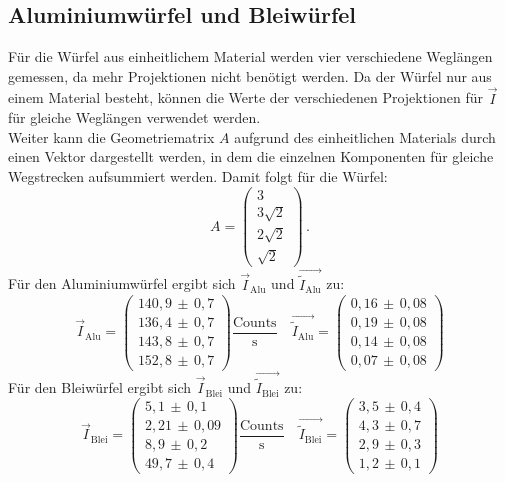 \subsection{Aluminiumwürfel und Bleiwürfel}
Für die Würfel aus einheitlichem Material werden vier verschiedene Weglängen gemessen, da mehr Projektionen nicht benötigt werden. Da der Würfel nur aus einem Material besteht, können die Werte der verschiedenen Projektionen für $\vec{I}$ für gleiche Weglängen verwendet werden. \\
Weiter kann die Geometriematrix $A$ aufgrund des einheitlichen Materials durch einen Vektor dargestellt werden, in dem die einzelnen Komponenten für gleiche Wegstrecken aufsummiert werden.
Damit folgt für die Würfel:
\begin{equation}
  A=
  \begin{pmatrix}
    3 \\
    3\sqrt{2} \\
    2\sqrt{2} \\
    \sqrt{2}
  \end{pmatrix} \, .
\end{equation}
\FloatBarrier
\noindent Für den Aluminiumwürfel ergibt sich $\vec{I}_\mathrm{Alu}$ und $\vec{\tilde{I}_\mathrm{Alu}}$ zu:
\begin{equation}
	\vec{I}_\mathrm{Alu}=
	\begin{pmatrix}
		140,9\,\pm\,0,7 \\
		136,4\,\pm\,0,7 \\
		143,8\,\pm\,0,7 \\
    152,8\,\pm\,0,7
	\end{pmatrix}
	\frac{\mathrm{Counts}}{\si{\second}}\quad
	\vec{\tilde{I}_\mathrm{Alu}}=
	\begin{pmatrix}
		0,16\,\pm\,0,08 \\
		0,19\,\pm\,0,08 \\
		0,14\,\pm\,0,08 \\
    0,07\,\pm\,0,08
	\end{pmatrix}
	\label{eqn:w2}
\end{equation}
\FloatBarrier
\noindent Für den Bleiwürfel ergibt sich $\vec{I}_\mathrm{Blei}$ und $\vec{\tilde{I}_\mathrm{Blei}}$ zu:
\begin{equation}
	\vec{I}_\mathrm{Blei}=
	\begin{pmatrix}
		5,1\,\pm\,0,1 \\
		2,21\,\pm\,0,09 \\
		8,9\,\pm\,0,2 \\
    49,7\,\pm\,0,4
	\end{pmatrix}
	\frac{\mathrm{Counts}}{\si{\second}}\quad
	\vec{\tilde{I}_\mathrm{Blei}}=
	\begin{pmatrix}
		3,5\,\pm\,0,4 \\
		4,3\,\pm\,0,7 \\
		2,9\,\pm\,0,3 \\
    1,2\,\pm\,0,1
	\end{pmatrix}
	\label{eqn:w3}
\end{equation}
